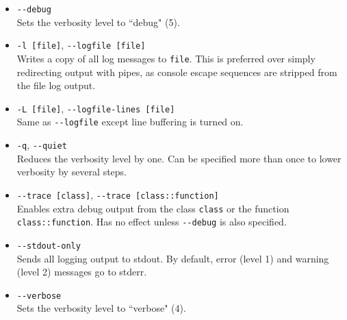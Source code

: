 \begin{itemize}

\item \texttt{-{}-debug}\\
Sets the verbosity level to ``debug" (5).

\item \texttt{-l [file]}, \texttt{-{}-logfile [file]}\\
Writes a copy of all log messages to \texttt{file}. This is preferred over simply redirecting output with pipes, as
console escape sequences are stripped from the file log output.

\item \texttt{-L [file]}, \texttt{-{}-logfile-lines [file]}\\
Same as \texttt{-{}-logfile} except line buffering is turned on.

\item \texttt{-q}, \texttt{-{}-quiet}\\
Reduces the verbosity level by one. Can be specified more than once to lower verbosity by several steps.

\item \texttt{-{}-trace [class]}, \texttt{-{}-trace [class::function]} \\
Enables extra debug output from the class \texttt{class} or the function \texttt{class::function}. Has no effect unless
\texttt{-{}-debug} is also specified.

\item \texttt{-{}-stdout-only}\\
Sends all logging output to stdout. By default, error (level 1) and warning (level 2) messages go to stderr.

\item \texttt{-{}-verbose}\\
Sets the verbosity level to ``verbose" (4).

\end{itemize}

